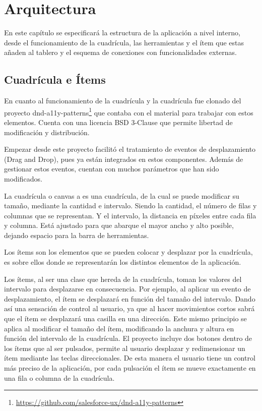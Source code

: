 \chapter{Arquitectura}
\label{cap:arquitectura}



\begin{resumen} 
 En este capítulo se especificará la estructura de la aplicación a nivel interno, desde el funcionamiento de la cuadrícula, las herramientas y el ítem que estas añaden al tablero y el esquema de conexiones con funcionalidades externas. 
\end{resumen}

\section{Cuadrícula e Ítems}

En cuanto al funcionamiento de la cuadrícula y la cuadrícula fue clonado del proyecto dnd-a11y-patterns\footnote{\url{https://github.com/salesforce-ux/dnd-a11y-patterns}} que contaba con el material para trabajar con estos elementos. Cuenta con una licencia BSD 3-Clause que permite libertad de modificación y distribución. 

Empezar desde este proyecto facilitó el  tratamiento de eventos de desplazamiento (Drag and Drop),  pues ya están integrados en estos componentes. Además de gestionar estos eventos, cuentan con muchos parámetros que han sido modificados. 

La cuadrícula o canvas a es una cuadrícula, de la cual se puede modificar su tamaño, mediante la cantidad e intervalo. Siendo la cantidad, el número de filas y columnas que se representan. Y el intervalo, la distancia en píxeles entre cada fila y columna. Está ajustado para que abarque el mayor ancho y alto posible, dejando espacio para la barra de herramientas. 

Los ítems son los elementos que se pueden colocar y desplazar por la cuadrícula, es sobre ellos donde se representarán los distintos elementos de la aplicación. 

Los ítems, al ser una clase que hereda de la cuadrícula, toman los valores del intervalo para desplazarse en consecuencia. Por ejemplo, al aplicar un evento de desplazamiento, el ítem se desplazará en función del tamaño del intervalo. Dando así una sensación de control al usuario, ya que al hacer movimientos cortos sabrá que el ítem se desplazará una casilla en una dirección. Este mismo principio se aplica al modificar el tamaño del ítem, modificando la anchura y altura en función del intervalo de la cuadrícula. El proyecto incluye dos botones dentro de los ítems que al ser pulsados, permite al usuario desplazar y redimensionar un ítem mediante las teclas direccionales. De esta manera el usuario tiene un control más preciso de la aplicación, por cada pulsación el ítem se mueve exactamente en una fila o columna de la cuadrícula.

